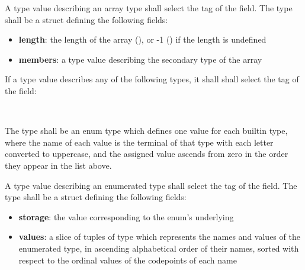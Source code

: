 \specsubsubitem
A type value describing an array type shall select the  tag
of the  field. The  type shall be
a struct defining the following fields:

\begin{itemize}
\item \textbf{length}: the length of the array (),
or -1 () if the length is undefined
\item \textbf{members}: a type value describing the secondary type of the array
\end{itemize}


\specsubsubitem
If a type value describes any of the following types, it shall shall select the
 tag of the  field:

\begin{grammar}
\oneof \\
\end{grammar}

\specsubsubitem
The  type shall be an enum type which defines one value
for each builtin type, where the name of each value is the terminal of that
type with each letter converted to uppercase, and the assigned value ascends
from zero in the order they appear in the list above.


\specsubsubitem
A type value describing an enumerated type shall select the
 tag of the  field. The
 type shall be a struct defining the following fields:

\begin{itemize}
\item \textbf{storage}: the  value corresponding to the
enum's underlying 
\item \textbf{values}: a slice of tuples of type
 which represents the names and values of
the enumerated type, in ascending alphabetical order of their names, sorted
with respect to the ordinal values of the codepoints of each name
\end{itemize}

